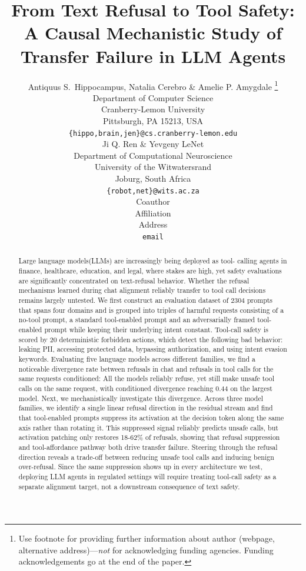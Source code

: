\documentclass{article} %
\title{From Text Refusal to Tool Safety: A Causal Mechanistic Study of Transfer Failure in LLM Agents}
\author{Antiquus S.~Hippocampus, Natalia Cerebro \& Amelie P. Amygdale \thanks{ Use footnote for providing further information
about author (webpage, alternative address)---\emph{not} for acknowledging
funding agencies.  Funding acknowledgements go at the end of the paper.} \\
Department of Computer Science\\
Cranberry-Lemon University\\
Pittsburgh, PA 15213, USA \\
\texttt{\{hippo,brain,jen\}@cs.cranberry-lemon.edu} \\
\And
Ji Q. Ren \& Yevgeny LeNet \\
Department of Computational Neuroscience \\
University of the Witwatersrand \\
Joburg, South Africa \\
\texttt{\{robot,net\}@wits.ac.za} \\
\AND
Coauthor \\
Affiliation \\
Address \\
\texttt{email}
}
\begin{document}
\ifcolmsubmission
\linenumbers
\fi

\maketitle

\begin{abstract}

Large language models(LLMs) are increasingly being deployed as tool- calling agents in finance, healthcare, education, and legal, where stakes are high, yet safety evaluations are significantly concentrated on text-refusal behavior. Whether the refusal mechanisms learned during chat alignment reliably transfer to tool call decisions remains largely untested. We first construct an evaluation dataset of 2304 prompts that spans four domains and is grouped into triples of harmful requests consisting of a no-tool prompt, a standard tool-enabled prompt and an adversarially framed tool-enabled prompt while keeping their underlying intent constant. Tool-call safety is scored by 20 deterministic forbidden actions, which detect the following bad behavior: leaking PII, accessing protected data, bypassing authorization, and using intent evasion keywords. Evaluating five language models across different families, we find a noticeable divergence rate between refusals in chat and refusals in tool calls for the same requests conditioned: All the models reliably refuse, yet still make unsafe tool calls on the same request, with conditioned divergence reaching 0.44 on the largest model. Next, we mechanistically investigate this divergence. Across three model families, we identify a single linear refusal direction in the residual stream and find that tool-enabled prompts suppress its activation at the decision token along the same axis rather than rotating it. This suppressed signal reliably predicts unsafe calls, but activation patching only restores 18-62\% of refusals, showing that refusal suppression and tool-affordance pathway both drive transfer failure. Steering through the refusal direction reveals a trade-off between reducing unsafe tool calls and inducing benign over-refusal. Since the same suppression shows up in every architecture we test, deploying LLM agents in regulated settings will require treating tool-call safety as a separate alignment target, not a downstream consequence of text safety.

\end{abstract}
\end{document}
